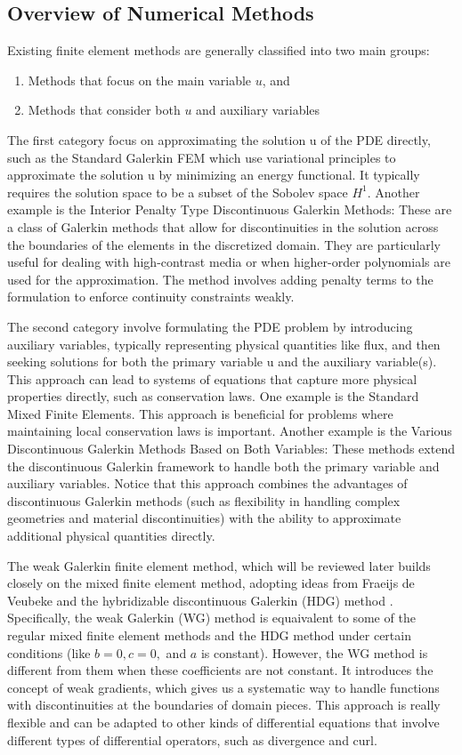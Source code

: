 \documentclass[12pt]{article} %
\begin{document}
\subsection{Overview of Numerical Methods}
Existing finite element methods are generally classified into two main groups: 
\begin{enumerate}
    \item Methods that focus on the main variable \( u \), and 
    \item Methods that consider both \( u \) and auxiliary variables
\end{enumerate}
The first category focus on approximating the solution u of the PDE directly, such as the Standard Galerkin FEM which 
use variational principles to approximate the solution u by minimizing an energy functional.
It typically requires the solution space to be a subset of the Sobolev space $H^1$. Another example is the Interior Penalty Type Discontinuous 
Galerkin Methods: These are a class of Galerkin methods that allow 
for discontinuities in the solution across the boundaries of the elements in the discretized domain. 
They are particularly useful for dealing with high-contrast media or when higher-order polynomials 
are used for the approximation. The method involves adding penalty terms to the formulation to 
enforce continuity constraints weakly.

The second category involve formulating the PDE problem by introducing auxiliary variables, 
typically representing physical quantities like flux, and then seeking solutions for
both the primary variable u and the auxiliary variable(s). This approach can lead to 
systems of equations that capture more physical properties directly, such as conservation 
laws. One example is the Standard Mixed Finite Elements. This approach 
is beneficial for problems where maintaining local conservation laws is important. Another example is the Various Discontinuous Galerkin Methods Based on Both Variables: These methods extend 
the discontinuous Galerkin framework to handle both the primary variable and auxiliary 
variables. Notice that this approach combines the advantages of discontinuous Galerkin 
methods (such as flexibility in handling complex geometries and material discontinuities) 
with the ability to approximate additional physical quantities directly. 


The weak Galerkin finite element method, which will be reviewed later builds closely on the mixed finite element method, adopting ideas from Fraeijs 
de Veubeke \cite{21,22} and the hybridizable discontinuous Galerkin (HDG) method \cite{18}. 
Specifically, the weak Galerkin (WG) method is equaivalent to some of the regular mixed finite element methods and the HDG 
method under certain conditions (like \( b = 0, c = 0, \) and \( a \) is constant). However, the WG method is different from them when these 
coefficients are not constant. It introduces the concept of weak gradients, which gives us a systematic way to handle functions  
with discontinuities at the boundaries of domain pieces. This approach is really flexible and can be adapted to other kinds of 
differential equations that involve different types of differential operators, such as divergence and curl.
\end{document}

